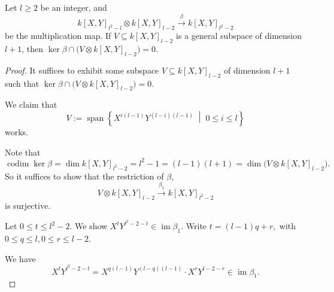 \documentclass[10pt,a4paper]{amsart}
\begin{document}
\begin{lemma}\label{algebra 2}
Let $l \geq 2$ be an integer, and
\[
k[X,Y]_{l^2-l}\otimes k[X,Y]_{l-2}
\xrightarrow{\ \beta\ }
k[X,Y]_{l^2-2}
\]
be the multiplication map. If $V \subseteq k[X,Y]_{l-2}$
is a general subspace of dimension $l+1$, then $\ker \beta \cap \bigl(V\otimes k[X,Y]_{l-2}\bigr)=0.$
\end{lemma}

\begin{proof}
It suffices to exhibit some subspace $V \subseteq k[X,Y]_{l-2}$
of dimension $l+1$ such that $\ker \beta \cap \bigl(V\otimes k[X,Y]_{l-2}\bigr)=0.$

We claim that
\[
V:=\operatorname{span}
\left\{
X^{i(l-1)}Y^{(l-i)(l-1)}
\;\middle|\;
0\le i\le l
\right\}
\]
works.

Note that
\[
\operatorname{codim}\ker\beta
=
\dim k[X,Y]_{l^2-2}
=
l^2-1
=
(l-1)(l+1)
=
\dim\bigl(V\otimes k[X,Y]_{l-2}\bigr).
\]
So it suffices to show that the restriction of $\beta$,
\[
V\otimes k[X,Y]_{l-2}
\xrightarrow{\ \beta_1\ }
k[X,Y]_{l^2-2}
\]
is surjective.

Let $0\le t\le l^2-2.$
We show $X^tY^{l^2-2-t}\in \operatorname{im}\beta_1.$
Write $t=(l-1)q+r,$ with $0\le q\le l, 0\le r\le l-2.$

We have
\[
X^tY^{l^2-2-t}
=
X^{q(l-1)}Y^{(l-q)(l-1)}
\cdot
X^rY^{l-2-r}
\in \operatorname{im}\beta_1.
\]
\end{proof}
\end{document}
